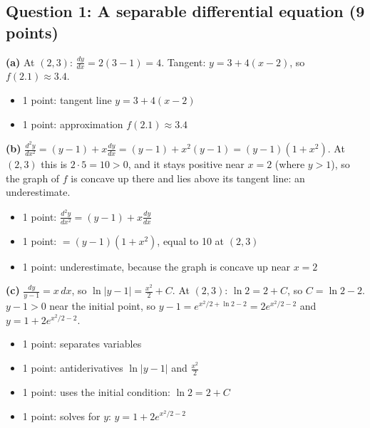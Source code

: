 \documentclass{apcalc}
\begin{document}
\subsection*{Question 1: A separable differential equation (9 points)}
\textbf{(a)} At $(2,3)$: $\frac{dy}{dx}=2(3-1)=4$. Tangent: $y=3+4(x-2)$, so $f(2.1)\approx3.4$.
\begin{itemize}[leftmargin=1.6em,itemsep=0pt]
\item 1 point: tangent line $y=3+4(x-2)$
\item 1 point: approximation $f(2.1)\approx3.4$
\end{itemize}
\textbf{(b)} $\frac{d^2y}{dx^2}=(y-1)+x\frac{dy}{dx}=(y-1)+x^2(y-1)=(y-1)(1+x^2)$. At $(2,3)$ this is $2\cdot5=10>0$, and it stays positive near $x=2$ (where $y>1$), so the graph of $f$ is concave up there and lies above its tangent line: an underestimate.
\begin{itemize}[leftmargin=1.6em,itemsep=0pt]
\item 1 point: $\frac{d^2y}{dx^2}=(y-1)+x\frac{dy}{dx}$
\item 1 point: $=(y-1)(1+x^2)$, equal to 10 at $(2,3)$
\item 1 point: underestimate, because the graph is concave up near $x=2$
\end{itemize}
\textbf{(c)} $\frac{dy}{y-1}=x\,dx$, so $\ln|y-1|=\frac{x^2}{2}+C$. At $(2,3)$: $\ln2=2+C$, so $C=\ln2-2$. $y-1>0$ near the initial point, so $y-1=e^{x^2/2+\ln2-2}=2e^{x^2/2-2}$ and $y=1+2e^{x^2/2-2}$.
\begin{itemize}[leftmargin=1.6em,itemsep=0pt]
\item 1 point: separates variables
\item 1 point: antiderivatives $\ln|y-1|$ and $\frac{x^2}{2}$
\item 1 point: uses the initial condition: $\ln2=2+C$
\item 1 point: solves for $y$: $y=1+2e^{x^2/2-2}$
\end{itemize}
\end{document}
